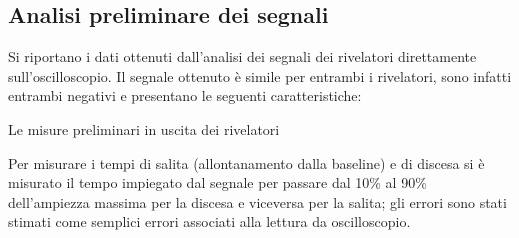 
%
\subsection{Analisi preliminare dei segnali}

Si riportano i dati ottenuti dall'analisi dei segnali dei rivelatori direttamente sull'oscilloscopio. Il segnale
ottenuto è simile per entrambi i rivelatori, sono infatti entrambi negativi e presentano le seguenti caratteristiche:\\

%
\begin{tabella}[h]
	\centering
	
	\caption{Le misure preliminari in uscita dei rivelatori}
	\label{tab:calib_pre}
\end{tabella}
%

Per misurare i tempi di salita (allontanamento dalla baseline) e di discesa si è misurato il tempo impiegato dal segnale per passare dal 10\% al 90\% dell'ampiezza
massima per la discesa e viceversa per la salita; gli errori sono stati stimati come semplici errori associati alla lettura da oscilloscopio.\\


